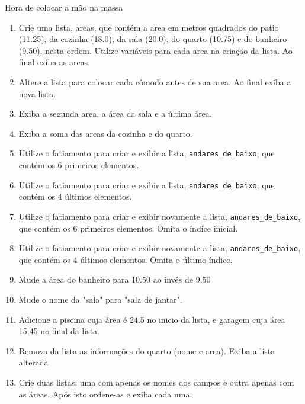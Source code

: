 \begin{frame}{Hora de colocar a mão na massa}
  \begin{enumerate}
    \item Crie uma lista, areas, que contém a area em metros quadrados do patio (11.25), da cozinha (18.0), da sala (20.0), do quarto (10.75) e do banheiro (9.50), nesta ordem. Utilize variáveis para cada area na criação da lista. Ao final exiba as areas.
    \item Altere a lista para colocar cada cômodo antes de sua area. Ao final exiba a nova lista.
    \item Exiba a segunda area, a área da sala e a última área.
    \item Exiba a soma das areas da cozinha e do quarto.
    \item Utilize o fatiamento para criar e exibir a lista, \verb!andares_de_baixo!, que contém os 6 primeiros elementos.
    \item Utilize o fatiamento para criar e exibir a lista, \verb!andares_de_baixo!, que contém os 4 últimos elementos. 
    \item Utilize o fatiamento para criar e exibir novamente a lista, \verb!andares_de_baixo!, que contém os 6 primeiros elementos. Omita o índice inicial.
    \item Utilize o fatiamento para criar e exibir novamente a lista, \verb!andares_de_baixo!, que contém os 4 últimos elementos. Omita o último índice.
    \item Mude a área do banheiro para 10.50 ao invés de 9.50
    \item Mude o nome da "sala" para "sala de jantar".
    \item Adicione a piscina cuja área é 24.5 no inicio da lista, e garagem cuja área 15.45 no final da lista.
    \item Remova da lista as informações do quarto (nome e area). Exiba a lista alterada
    \item Crie duas listas: uma com apenas os nomes dos campos e outra apenas com as áreas. Após isto ordene-as e exiba cada uma.
  \end{enumerate}
\end{frame}